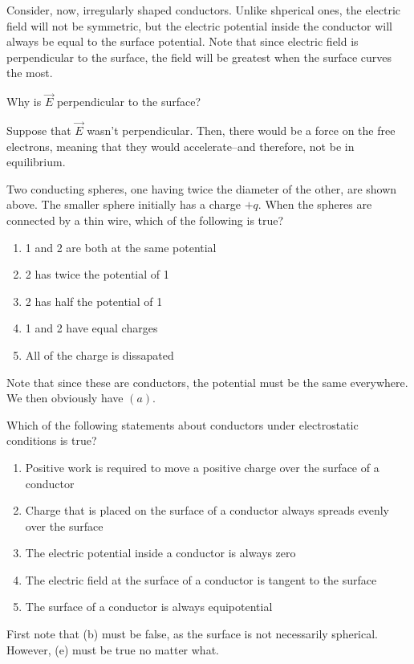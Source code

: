 \documentclass[11pt]{article}
\begin{document}
Consider, now, irregularly shaped conductors. Unlike shperical ones, the electric field will not be symmetric, but the electric potential inside the conductor will always be equal to the surface potential. Note that since electric field is perpendicular to the surface, the field will be greatest when the surface curves the most.
\begin{question}
    Why is $\vec{E}$ perpendicular to the surface?    
\end{question}
Suppose that $\vec{E}$ wasn't perpendicular. Then, there would be a force on the free electrons, meaning that they would accelerate--and therefore, not be in equilibrium.
\begin{example}
    Two conducting spheres, one having twice the diameter of the other, are shown above. The smaller sphere initially has a charge $+q$. When the spheres are connected by a thin wire, which of the following is true?
    \begin{enumerate}[noitemsep, label=(\alph*)]
        \item 1 and 2 are both at the same potential
        \item 2 has twice the potential of 1
        \item 2 has half the potential of 1
        \item 1 and 2 have equal charges
        \item All of the charge is dissapated
    \end{enumerate}
\end{example}
\begin{solution}
    Note that since these are conductors, the potential must be the same everywhere. We then obviously have $\boxed{(a)}$.   
\end{solution}
\begin{example}
    Which of the following statements about conductors under electrostatic conditions is true?
    \begin{enumerate}[noitemsep, label=(\alph*)]
        \item Positive work is required to move a positive charge over the surface of a conductor
        \item Charge that is placed on the surface of a conductor always spreads evenly over the surface
        \item The electric potential inside a conductor is always zero
        \item The electric field at the surface of a conductor is tangent to the surface
        \item The surface of a conductor is always equipotential
    \end{enumerate}
\end{example}
\begin{solution}
    First note that (b) must be false, as the surface is not necessarily spherical. However, (e) must be true no matter what.
\end{solution}
\end{document}
